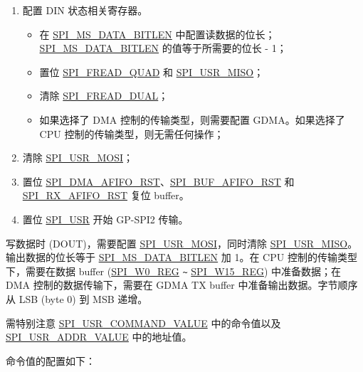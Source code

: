 \documentclass[main\_\_CN.tex]{subfiles}
\begin{document}
\begin{enumerate}
    \item 配置 DIN 状态相关寄存器。
        \begin{itemize}
            \item 在 \hyperref[fielddesc:SPIMSDATABITLEN]{SPI\_MS\_DATA\_BITLEN} 中配置读数据的位长； \hyperref[fielddesc:SPIMSDATABITLEN]{SPI\_MS\_DATA\_BITLEN} 的值等于所需要的位长 - 1；
            \item 置位 \hyperref[fielddesc:SPIFREADQUAD]{SPI\_FREAD\_QUAD} 和 \hyperref[fielddesc:SPIUSRMISO]{SPI\_USR\_MISO}；
            \item 清除 \hyperref[fielddesc:SPIFREADDUAL]{SPI\_FREAD\_DUAL}；
            \item 如果选择了 DMA 控制的传输类型，则需要配置 GDMA。如果选择了 CPU 控制的传输类型，则无需任何操作；
        \end{itemize}   
    
    \item 清除 \hyperref[fielddesc:SPIUSRMOSI]{SPI\_USR\_MOSI}；
    \item 置位 \hyperref[fielddesc:SPIDMAAFIFORST]{SPI\_DMA\_AFIFO\_RST}、\hyperref[fielddesc:SPIBUFAFIFORST]{SPI\_BUF\_AFIFO\_RST} 和 \hyperref[fielddesc:SPIRXAFIFORST]{SPI\_RX\_AFIFO\_RST} 复位 buffer。
    
    \item 置位 \hyperref[fielddesc:SPIUSR]{SPI\_USR} 开始 GP-SPI2 传输。
\end{enumerate}
写数据时 (DOUT)，需要配置 \hyperref[fielddesc:SPIUSRMOSI]{SPI\_USR\_MOSI}，同时清除 \hyperref[fielddesc:SPIUSRMISO]{SPI\_USR\_MISO}。输出数据的位长等于 \hyperref[fielddesc:SPIMSDATABITLEN]{SPI\_MS\_DATA\_BITLEN} 加 1。在 CPU 控制的传输类型下，需要在数据 buffer (\hyperref[regdesc:SPIW0REG]{SPI\_W0\_REG} \verb+~+ \hyperref[regdesc:SPIW0REG]{SPI\_W15\_REG}) 中准备数据；在 DMA 控制的数据传输下，需要在 GDMA TX buffer 中准备输出数据。字节顺序从 LSB (byte 0) 到 MSB 递增。

需特别注意 \hyperref[fielddesc:SPIUSRCOMMANDVALUE]{SPI\_USR\_COMMAND\_VALUE} 中的命令值以及 \hyperref[fielddesc:SPIUSRADDRVALUE]{SPI\_USR\_ADDR\_VALUE} 中的地址值。 

命令值的配置如下：
\end{document}
